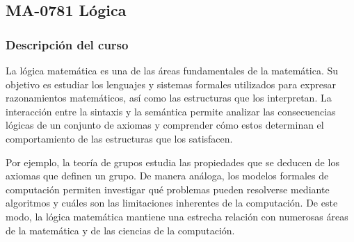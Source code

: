 \newpage
\subsection*{MA-0781 Lógica}

\hypertarget{MA0781}{}
\begin{refsection}
\begin{table}[H]
\end{table}

\subsubsection*{Descripción del curso}

La lógica matemática es una de las áreas fundamentales de la matemática. Su objetivo es estudiar los lenguajes y sistemas formales utilizados para expresar razonamientos matemáticos, así como las estructuras que los interpretan. La interacción entre la sintaxis y la semántica permite analizar las consecuencias lógicas de un conjunto de axiomas y comprender cómo estos determinan el comportamiento de las estructuras que los satisfacen.

Por ejemplo, la teoría de grupos estudia las propiedades que se deducen de los axiomas que definen un grupo. De manera análoga, los modelos formales de computación permiten investigar qué problemas pueden resolverse mediante algoritmos y cuáles son las limitaciones inherentes de la computación. De este modo, la lógica matemática mantiene una estrecha relación con numerosas áreas de la matemática y de las ciencias de la computación.


\end{refsection}
